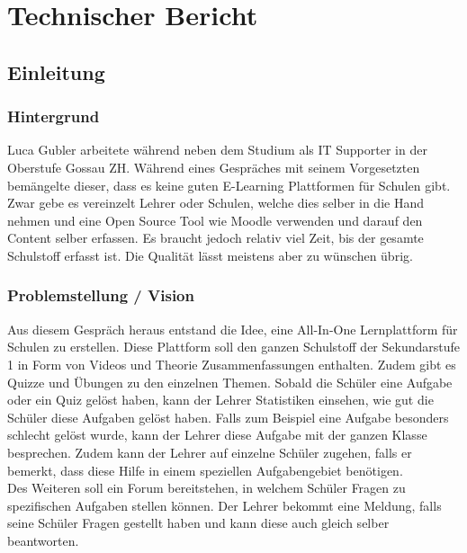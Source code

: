 \section{Technischer Bericht}
\subsection{Einleitung}

\subsubsection{Hintergrund}
Luca Gubler arbeitete während neben dem Studium als IT Supporter in der Oberstufe Gossau ZH. Während eines Gespräches mit seinem Vorgesetzten bemängelte dieser, dass es keine guten E-Learning Plattformen für Schulen gibt. Zwar gebe es vereinzelt Lehrer oder Schulen, welche dies selber in die Hand nehmen und eine Open Source Tool wie Moodle verwenden und darauf den Content selber erfassen. Es braucht jedoch relativ viel Zeit, bis der gesamte Schulstoff erfasst ist. Die Qualität lässt meistens aber zu wünschen übrig.

\subsubsection{Problemstellung / Vision}
Aus diesem Gespräch heraus entstand die Idee, eine All-In-One Lernplattform für Schulen zu erstellen. Diese Plattform soll den ganzen Schulstoff der Sekundarstufe 1 in Form von Videos und Theorie Zusammenfassungen enthalten. Zudem gibt es Quizze und Übungen zu den einzelnen Themen. Sobald die Schüler eine Aufgabe oder ein Quiz gelöst haben, kann der Lehrer Statistiken einsehen, wie gut die Schüler diese Aufgaben gelöst haben. Falls zum Beispiel eine Aufgabe besonders schlecht gelöst wurde, kann der Lehrer diese Aufgabe mit der ganzen Klasse besprechen. Zudem kann der Lehrer auf einzelne Schüler zugehen, falls er bemerkt, dass diese Hilfe in einem speziellen Aufgabengebiet benötigen.
\\
Des Weiteren soll ein Forum bereitstehen, in welchem Schüler Fragen zu spezifischen Aufgaben stellen können. Der Lehrer bekommt eine Meldung, falls seine Schüler Fragen gestellt haben und kann diese auch gleich selber beantworten.

